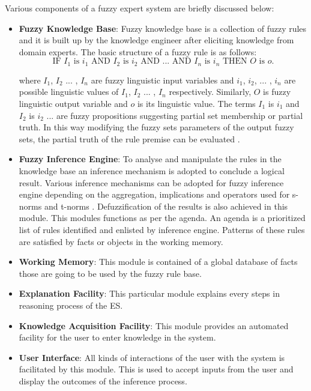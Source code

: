 \documentclass{ws-ijufks}
\begin{document}
Various components of a fuzzy expert system are briefly discussed below:
\begin{itemize}
	
	\item \textbf{Fuzzy Knowledge Base}: Fuzzy knowledge base is a collection of fuzzy 
	rules and it is built up by the 	knowledge engineer after eliciting knowledge from 
	domain experts. The basic structure of a fuzzy rule is as follows:
	\begin{equation*}
	\text{IF } I_1 \text{ is } i_1 \text{ AND } I_2 \text{ is } i_2 \text{ AND ... AND } I_n \text{ is } i_n \text{ 
	THEN } O \text{ is }o. 
	\end{equation*}
	
	where $I_1$, $I_2$ ... , $I_n$ are fuzzy linguistic input variables and $i_1$, $i_2$, 
	... , $i_n$ are possible linguistic values of $I_1$, $I_2$ ... , $I_n$ respectively. 
	Similarly, $O$ is fuzzy linguistic output variable and 	$o$ is its linguistic value. 
	The terms $I_1$ is $i_1$ and $I_2$ is $i_2$ ... are fuzzy propositions suggesting  
	partial  set  membership  or  partial  truth. In this way modifying the fuzzy sets 
	parameters of the output fuzzy sets, the  partial  truth  of  the  rule premise can 
	be evaluated \cite{matthews2003formal}.
	
	\item \textbf{Fuzzy Inference Engine}: To  analyse  and manipulate  the  rules  in  
	the  knowledge  base an inference mechanism is adopted to conclude a logical result. 
	Various inference mechanisms  can  be  adopted  for  fuzzy  inference  engine  
	depending on  the  aggregation, implications and operators used for s-norms and 
	t-norms \cite{wang1999course}. Defuzzification of the results is also achieved  in 
	this module. This modules functions as per the agenda. An agenda is a prioritized 
	list of rules identified and enlisted by inference engine. Patterns of these rules 
	are satisfied by facts or objects in the working memory. 
	
	\item \textbf{Working Memory}: This module is contained of a global database of facts 
	those are going to be used by the fuzzy rule base.
	
	\item \textbf{Explanation Facility}: This particular module explains every steps in reasoning process of the ES.
	
	\item \textbf{Knowledge Acquisition Facility}: This module provides an automated facility for the user to enter 
	knowledge in the system.
	
	\item \textbf{User Interface}: All kinds of interactions of the user with the system is facilitated by this module. 
	This is used to accept inputs from the user and display the outcomes of the inference process.
\end{itemize}
\end{document}
